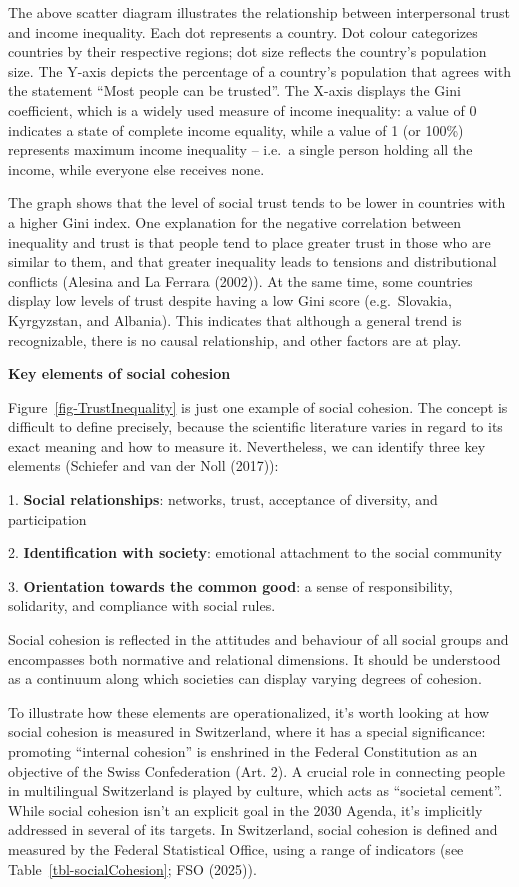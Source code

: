 \documentclass[
  a4paper,
  openany]{book}
\begin{document}
The above scatter diagram illustrates the relationship between
interpersonal trust and income inequality. Each dot represents a
country. Dot colour categorizes countries by their respective regions;
dot size reflects the country's population size. The Y-axis depicts the
percentage of a country's population that agrees with the statement
``Most people can be trusted''. The X-axis displays the Gini
coefficient, which is a widely used measure of income inequality: a
value of 0 indicates a state of complete income equality, while a value
of 1 (or 100\%) represents maximum income inequality -- i.e.~a single
person holding all the income, while everyone else receives none.

The graph shows that the level of social trust tends to be lower in
countries with a higher Gini index. One explanation for the negative
correlation between inequality and trust is that people tend to place
greater trust in those who are similar to them, and that greater
inequality leads to tensions and distributional conflicts (Alesina and
La Ferrara (2002)). At the same time, some countries display low levels
of trust despite having a low Gini score (e.g.~Slovakia, Kyrgyzstan, and
Albania). This indicates that although a general trend is recognizable,
there is no causal relationship, and other factors are at play.

\textbf{Key elements of social cohesion}

Figure~\ref{fig-TrustInequality} is just one example of social cohesion.
The concept is difficult to define precisely, because the scientific
literature varies in regard to its exact meaning and how to measure it.
Nevertheless, we can identify three key elements (Schiefer and van der
Noll (2017)):

1. \textbf{Social relationships}: networks, trust, acceptance of
diversity, and participation

2. \textbf{Identification with society}: emotional attachment to the
social community

3. \textbf{Orientation towards the common good}: a sense of
responsibility, solidarity, and compliance with social rules.

Social cohesion is reflected in the attitudes and behaviour of all
social groups and encompasses both normative and relational dimensions.
It should be understood as a continuum along which societies can display
varying degrees of cohesion.

To illustrate how these elements are operationalized, it's worth looking
at how social cohesion is measured in Switzerland, where it has a
special significance: promoting ``internal cohesion'' is enshrined in
the Federal Constitution as an objective of the Swiss Confederation
(Art. 2). A crucial role in connecting people in multilingual
Switzerland is played by culture, which acts as ``societal cement''.
While social cohesion isn't an explicit goal in the 2030 Agenda, it's
implicitly addressed in several of its targets. In Switzerland, social
cohesion is defined and measured by the Federal Statistical Office,
using a range of indicators (see Table~\ref{tbl-socialCohesion}; FSO
(2025)).
\end{document}
